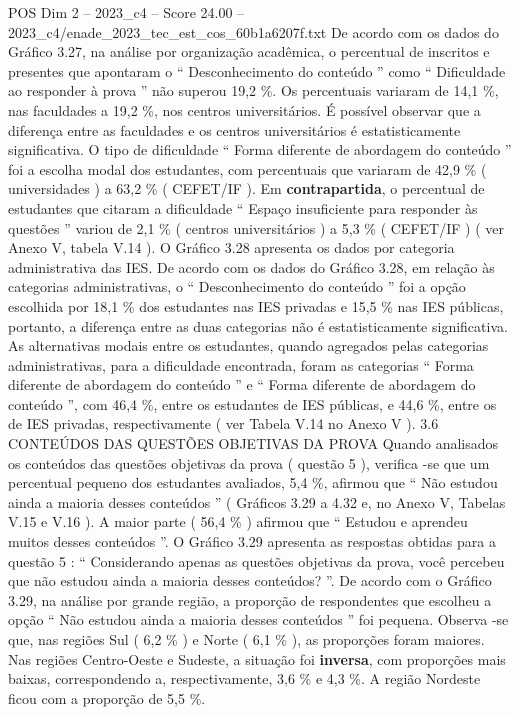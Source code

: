 \begin{textsample}{POS Dim 2 – 2023\_c4 – Score 24.00 – 2023\_c4/enade\_2023\_tec\_est\_cos\_60b1a6207f.txt}
De acordo com os dados do Gráfico 3.27, na análise por organização acadêmica, o percentual de inscritos e presentes que apontaram o “ Desconhecimento do conteúdo ” como “ Dificuldade ao responder à prova ” não superou 19,2 \%.
Os percentuais variaram de 14,1 \%, nas faculdades a 19,2 \%, nos centros universitários.
É possível observar que a diferença entre as faculdades e os centros universitários é estatisticamente significativa.
O tipo de dificuldade “ Forma diferente de abordagem do conteúdo ” foi a escolha modal dos estudantes, com percentuais que variaram de 42,9 \% ( universidades ) a 63,2 \% ( CEFET/IF ).
Em \textbf{contrapartida}, o percentual de estudantes que citaram a dificuldade “ Espaço insuficiente para responder às questões ” variou de 2,1 \% ( centros universitários ) a 5,3 \% ( CEFET/IF ) ( ver Anexo V, tabela V.14 ).
O Gráfico 3.28 apresenta os dados por categoria administrativa das IES.
De acordo com os dados do Gráfico 3.28, em relação às categorias administrativas, o “ Desconhecimento do conteúdo ” foi a opção escolhida por 18,1 \% dos estudantes nas IES privadas e 15,5 \% nas IES públicas, portanto, a diferença entre as duas categorias não é estatisticamente significativa.
As alternativas modais entre os estudantes, quando agregados pelas categorias administrativas, para a dificuldade encontrada, foram as categorias “ Forma diferente de abordagem do conteúdo ” e “ Forma diferente de abordagem do conteúdo ”, com 46,4 \%, entre os estudantes de IES públicas, e 44,6 \%, entre os de IES privadas, respectivamente ( ver Tabela V.14 no Anexo V ). 3.6 CONTEÚDOS DAS QUESTÕES OBJETIVAS DA PROVA Quando analisados os conteúdos das questões objetivas da prova ( questão 5 ), verifica -se que um percentual pequeno dos estudantes avaliados, 5,4 \%, afirmou que “ Não estudou ainda a maioria desses conteúdos ” ( Gráficos 3.29 a 4.32 e, no Anexo V, Tabelas V.15 e V.16 ).
A maior parte ( 56,4 \% ) afirmou que “ Estudou e aprendeu muitos desses conteúdos ”.
O Gráfico 3.29 apresenta as respostas obtidas para a questão 5 : “ Considerando apenas as questões objetivas da prova, você percebeu que não estudou ainda a maioria desses conteúdos? ”.
De acordo com o Gráfico 3.29, na análise por grande região, a proporção de respondentes que escolheu a opção “ Não estudou ainda a maioria desses conteúdos ” foi pequena.
Observa -se que, nas regiões Sul ( 6,2 \% ) e Norte ( 6,1 \% ), as proporções foram maiores.
Nas regiões Centro-Oeste e Sudeste, a situação foi \textbf{inversa}, com proporções mais baixas, correspondendo a, respectivamente, 3,6 \% e 4,3 \%.
A região Nordeste ficou com a proporção de 5,5 \%.

\end{textsample}
